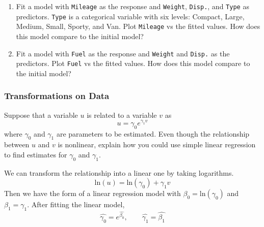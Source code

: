 \begin{enumerate}
\item Fit a model with \texttt{Mileage} as the response and
  \texttt{Weight}, \texttt{Disp.}, and \texttt{Type} as predictors.
  \texttt{Type} is a categorical variable with six levels: Compact,
  Large, Medium, Small, Sporty, and Van.
  Plot \texttt{Mileage} vs the fitted values. How does this model
  compare to the initial model?
\item Fit a model with \texttt{Fuel} as the response and
  \texttt{Weight} and \texttt{Disp.} as the predictors.  Plot
  \texttt{Fuel} vs the fitted values.  How does this model compare
  to the initial model?
\end{enumerate}

\subsubsection*{Transformations on Data}
  Suppose that a variable $u$ is related to a variable $v$ as
\[
u = \gamma_0e^{\gamma_1v}
\]
where $\gamma_0$ and $\gamma_1$ are parameters to be estimated.  Even
though the relationship between $u$ and $v$ is nonlinear, explain how
you could use simple linear regression to find estimates for
$\gamma_0$ and $\gamma_1$.

We can transform the relationship into a linear one
by taking logarithms.
\[
\text{ln}(u) = \text{ln}(\gamma_0) + \gamma_1v
\]
Then we have the form of a linear regression model with $\beta_0 = \text{ln}(\gamma_0)$
and $\beta_1 = \gamma_1$. After fitting the linear model,
\[
\hat{\gamma_0}=e^{\hat{\beta_0}}, \qquad \hat{\gamma_1} = \hat{\beta_1}
\]

